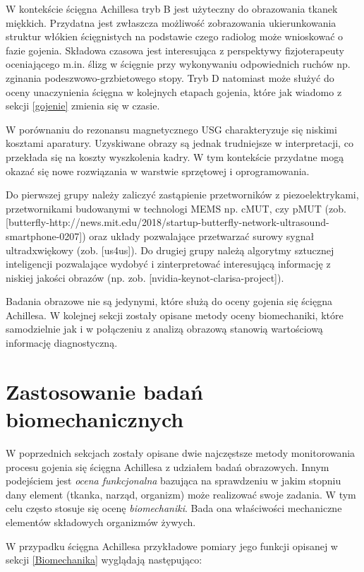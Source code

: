W kontekście ścięgna Achillesa tryb B jest użyteczny do obrazowania tkanek miękkich. Przydatna jest zwłaszcza możliwość zobrazowania ukierunkowania struktur włókien ścięgnistych na podstawie czego radiolog może wnioskować o fazie gojenia. Składowa czasowa jest interesująca z perspektywy fizjoterapeuty oceniającego m.in. ślizg w ścięgnie przy wykonywaniu odpowiednich ruchów np. zginania podeszwowo-grzbietowego stopy. Tryb D natomiast może służyć do oceny unaczynienia ścięgna w kolejnych etapach gojenia, które jak wiadomo z sekcji \ref{gojenie} zmienia się w czasie.

W porównaniu do rezonansu magnetycznego USG charakteryzuje się niskimi kosztami aparatury. Uzyskiwane obrazy są jednak trudniejsze w interpretacji, co przekłada się na koszty wyszkolenia kadry. W tym kontekście przydatne mogą okazać się nowe rozwiązania w warstwie sprzętowej i oprogramowania. 

Do pierwszej grupy należy zaliczyć zastąpienie przetworników z piezoelektrykami, przetwornikami budowanymi w technologi MEMS np. cMUT, czy pMUT (zob. [butterfly-http://news.mit.edu/2018/startup-butterfly-network-ultrasound-smartphone-0207]) oraz układy pozwalające przetwarzać surowy sygnał ultradxwiękowy (zob. [us4us]). Do drugiej grupy należą algorytmy sztucznej inteligencji pozwalające wydobyć i zinterpretować interesującą informację z niskiej jakości obrazów (np. zob. [nvidia-keynot-clarisa-project]). 

Badania obrazowe nie są jedynymi, które służą do oceny gojenia się ścięgna Achillesa. W kolejnej sekcji zostały opisane metody oceny biomechaniki, które samodzielnie jak i w połączeniu z analizą obrazową stanowią wartościową informację diagnostyczną.

\section{Zastosowanie badań biomechanicznych}

W poprzednich sekcjach zostały opisane dwie najczęstsze metody monitorowania procesu gojenia się ścięgna Achillesa z udziałem badań obrazowych. Innym podejściem jest \textit{ocena funkcjonalna} bazująca na sprawdzeniu w jakim stopniu dany element (tkanka, narząd, organizm) może realizować swoje zadania. W tym celu często stosuje się ocenę \textit{biomechaniki}. Bada ona właściwości mechaniczne elementów składowych organizmów żywych. 

W przypadku ścięgna Achillesa przykładowe pomiary jego funkcji opisanej w sekcji \ref{Biomechanika} wyglądają następująco:


